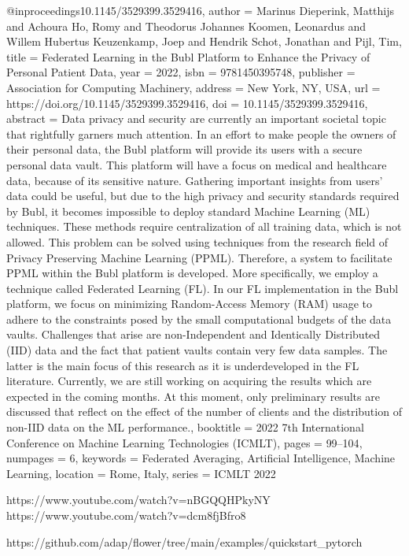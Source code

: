@inproceedings{10.1145/3529399.3529416,
author = {Marinus Dieperink, Matthijs and Achoura Ho, Romy and Theodorus Johannes Koomen, Leonardus and Willem Hubertus Keuzenkamp, Joep and Hendrik Schot, Jonathan and Pijl, Tim},
title = {Federated Learning in the Bubl Platform to Enhance the Privacy of Personal Patient Data},
year = {2022},
isbn = {9781450395748},
publisher = {Association for Computing Machinery},
address = {New York, NY, USA},
url = {https://doi.org/10.1145/3529399.3529416},
doi = {10.1145/3529399.3529416},
abstract = {Data privacy and security are currently an important societal topic that rightfully garners much attention. In an effort to make people the owners of their personal data, the Bubl platform will provide its users with a secure personal data vault. This platform will have a focus on medical and healthcare data, because of its sensitive nature. Gathering important insights from users’ data could be useful, but due to the high privacy and security standards required by Bubl, it becomes impossible to deploy standard Machine Learning (ML) techniques. These methods require centralization of all training data, which is not allowed. This problem can be solved using techniques from the research field of Privacy Preserving Machine Learning (PPML). Therefore, a system to facilitate PPML within the Bubl platform is developed. More specifically, we employ a technique called Federated Learning (FL). In our FL implementation in the Bubl platform, we focus on minimizing Random-Access Memory (RAM) usage to adhere to the constraints posed by the small computational budgets of the data vaults. Challenges that arise are non-Independent and Identically Distributed (IID) data and the fact that patient vaults contain very few data samples. The latter is the main focus of this research as it is underdeveloped in the FL literature. Currently, we are still working on acquiring the results which are expected in the coming months. At this moment, only preliminary results are discussed that reflect on the effect of the number of clients and the distribution of non-IID data on the ML performance.},
booktitle = {2022 7th International Conference on Machine Learning Technologies (ICMLT)},
pages = {99–104},
numpages = {6},
keywords = {Federated Averaging, Artificial Intelligence, Machine Learning},
location = {Rome, Italy},
series = {ICMLT 2022}
}

https://www.youtube.com/watch?v=nBGQQHPkyNY
https://www.youtube.com/watch?v=dcm8fjBfro8

https://github.com/adap/flower/tree/main/examples/quickstart_pytorch
